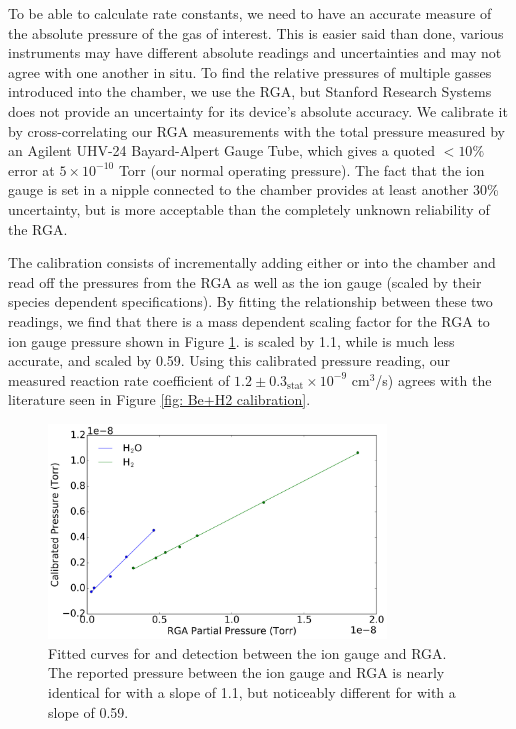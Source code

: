 To be able to calculate rate constants, we need to have an accurate measure of the absolute pressure of the gas of interest. This is easier said than done, various instruments may have different absolute readings and uncertainties and may not agree with one another in situ. To find the relative pressures of multiple gasses introduced into the chamber, we use the RGA, but Stanford Research Systems does not provide an uncertainty for its device's absolute accuracy. We calibrate it by cross-correlating our RGA measurements with the total pressure measured by an Agilent UHV-24 Bayard-Alpert Gauge Tube, which gives a quoted $<10\%$ error at $5 \times 10^{-10}$ Torr (our normal operating pressure). The fact that the ion gauge is set in a nipple connected to the chamber provides at least another 30\% uncertainty, but is more acceptable than the completely unknown reliability of the RGA.

The calibration consists of incrementally adding either  or  into the chamber and read off the pressures from the RGA as well as the ion gauge (scaled by their species dependent specifications). By fitting the relationship between these two readings, we find that there is a mass dependent scaling factor for the RGA to ion gauge pressure shown in Figure \ref{fig: rga calibration}.  is scaled by 1.1, while  is much less accurate, and scaled by 0.59. Using this calibrated pressure reading, our measured  reaction rate coefficient of $1.2 \pm 0.3_{\text{stat}} \times 10^{-9}$ cm$^3$/s) agrees with the literature seen in Figure \ref{fig: Be+H2 calibration}.

\begin{figure}[H]
	\centering
	\includegraphics[width=0.8\textwidth]{images/pressure_calibration.png}
	\caption{Fitted curves for  and  detection between the ion gauge and RGA. The reported pressure between the ion gauge and RGA is nearly identical for  with a slope of 1.1, but noticeably different for  with a slope of 0.59.}
	\label{fig: rga calibration}
\end{figure}

